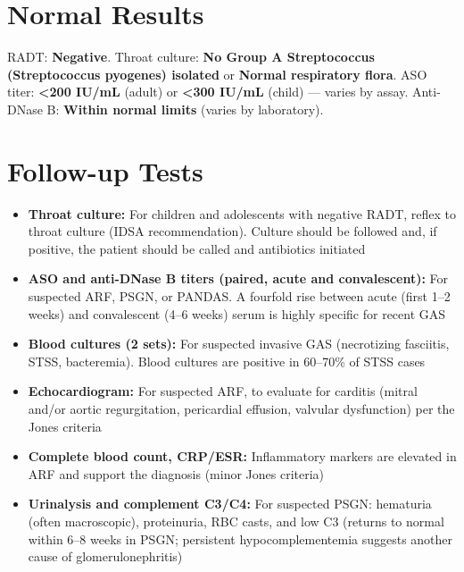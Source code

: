 \section*{Normal Results}
RADT: \textbf{Negative}. Throat culture: \textbf{No Group A Streptococcus (Streptococcus pyogenes) isolated} or \textbf{Normal respiratory flora}. ASO titer: \textbf{<200 IU/mL} (adult) or \textbf{<300 IU/mL} (child) --- varies by assay. Anti-DNase B: \textbf{Within normal limits} (varies by laboratory).

\section*{Follow-up Tests}
\begin{itemize}
  \item \textbf{Throat culture:} For children and adolescents with negative RADT, reflex to throat culture (IDSA recommendation). Culture should be followed and, if positive, the patient should be called and antibiotics initiated
  \item \textbf{ASO and anti-DNase B titers (paired, acute and convalescent):} For suspected ARF, PSGN, or PANDAS. A fourfold rise between acute (first 1--2 weeks) and convalescent (4--6 weeks) serum is highly specific for recent GAS
  \item \textbf{Blood cultures (2 sets):} For suspected invasive GAS (necrotizing fasciitis, STSS, bacteremia). Blood cultures are positive in 60--70\% of STSS cases
  \item \textbf{Echocardiogram:} For suspected ARF, to evaluate for carditis (mitral and/or aortic regurgitation, pericardial effusion, valvular dysfunction) per the Jones criteria
  \item \textbf{Complete blood count, CRP/ESR:} Inflammatory markers are elevated in ARF and support the diagnosis (minor Jones criteria)
  \item \textbf{Urinalysis and complement C3/C4:} For suspected PSGN: hematuria (often macroscopic), proteinuria, RBC casts, and low C3 (returns to normal within 6--8 weeks in PSGN; persistent hypocomplementemia suggests another cause of glomerulonephritis)
\end{itemize}

